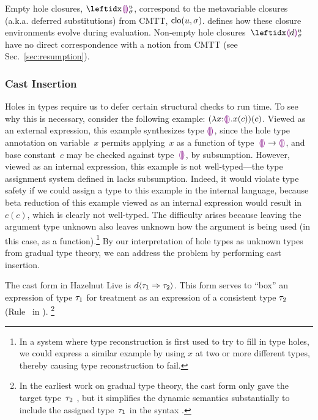 Empty hole closures, $\dehole{u}{\sigma}{}$,  correspond to the metavariable closures (a.k.a. deferred substitutions) from CMTT, $\mathsf{clo}(u, \sigma)$.
%
 defines how these closure environments evolve during evaluation.
%
Non-empty hole closures~$\dhole{d}{u}{\sigma}{}$ have no direct correspondence with a notion from CMTT (see Sec.~\ref{sec:resumption}).

\subsubsection{Cast Insertion}\label{sec:cast-insertion}
%
%
Holes in types require us to defer certain structural checks to run time.
%
To see why this is necessary, consider the following
example: $(\lambda x{:}\textcolor{violet}{\llparenthesis}\textcolor{violet}{\rrparenthesis}.x(c))(c)$.
%
Viewed as an external expression, this example synthesizes type
$\textcolor{violet}{\llparenthesis}\textcolor{violet}{\rrparenthesis}$, since the hole type annotation on variable~$x$ permits
applying~$x$ as a function of type~$\textcolor{violet}{\llparenthesis}\textcolor{violet}{\rrparenthesis} \rightarrow \textcolor{violet}{\llparenthesis}\textcolor{violet}{\rrparenthesis}$, and base
constant~$c$ may be checked against type~$\textcolor{violet}{\llparenthesis}\textcolor{violet}{\rrparenthesis}$, by subsumption.
%
However, viewed as an internal expression, this example is not
well-typed---the type assignment system defined in
 lacks subsumption.
%
Indeed, it would violate type safety if we could assign a type to this
example in the internal language, because beta reduction of this
example viewed as an internal expression would result in $c(c)$, which
is clearly not well-typed.
%
The difficulty arises because leaving the argument type unknown also leaves unknown how
the argument is being used (in this case, as a function).\footnote{In a system where type reconstruction is first used
to try to fill in type holes, we could express a similar example by
using $x$ at two or more different types, thereby causing type
reconstruction to fail.
%
}
By our interpretation of hole types as unknown types from gradual type
theory, we can address the problem by performing cast insertion.
%

The cast form in Hazelnut Live is $d \langle{\tau_1}\Rightarrow{\tau_2}\rangle$.
%
This form serves to ``box'' an expression of type $\tau_1$ for
treatment as an expression of a consistent type $\tau_2$
(Rule~ in ).%
\footnote{
In the earliest work on gradual type theory, the cast form only gave
the target type~$\tau_2$ \cite{Siek06a}, but it simplifies the dynamic semantics substantially
to include the assigned type~$\tau_1$ in the syntax \cite{DBLP:conf/snapl/SiekVCB15}.
}

